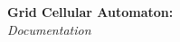 \documentclass[a4paper, 12pt]{article}
\begin{document}


\begin{center}
{\large \textbf{Grid Cellular Automaton:}\\\vspace{.5cm}
\textit{Documentation}}
\end{center}

\vspace{2cm}






\end{document}
